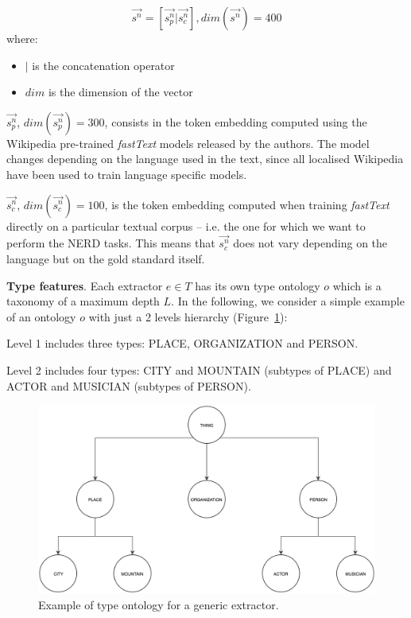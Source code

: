 \documentclass{llncs}
\newcommand{\figref}[1]{\mbox{Figure~\ref{#1}}}
\begin{document}
\begin{equation}
\vec{s^{n}} = \left [  \vec{s^{n}_p}|\vec{s^{n}_c} \right ], dim(\vec{s^{n}})=400
\end{equation}
where: 
\begin{itemize}
    \item[] $|$ is the concatenation operator
    \item[] $dim$ is the dimension of the vector
\end{itemize}

$\vec{s^{n}_p}$, $dim(\vec{s^{n}_p})=300$, consists in the token embedding computed using the Wikipedia pre-trained \textit{fastText} models released by the authors. The model changes depending on the language used in the text, since all localised Wikipedia have been used to train language specific models.

$\vec{s^{n}_c}$, $dim(\vec{s^{n}_c})=100$, is the token embedding computed when training \textit{fastText} directly on a particular textual corpus -- i.e. the one for which we want to perform the NERD tasks. This means that $\vec{s^{n}_c}$ does not vary depending on the language but on the gold standard itself.

\textbf{Type features}. Each extractor $e \in T$ has its own type ontology $o$ which is a taxonomy of a maximum depth $L$. In the following, we consider a simple example of an ontology $o$ with just a 2 levels hierarchy (\figref{fig:ontology}):
\begin{enumerate}
\begin{item}
Level 1 includes three types: PLACE, ORGANIZATION and PERSON.
\end{item}
\begin{item}
Level 2 includes four types: CITY and MOUNTAIN (subtypes of PLACE) and ACTOR and MUSICIAN (subtypes of PERSON). 
\end{item}
\end{enumerate}

\begin{figure}
	\centering
    \includegraphics[scale=0.23]{onotlogy.png}
 	\caption{Example of type ontology for a generic extractor.}
 	\label{fig:ontology}
\end{figure}
\end{document}
